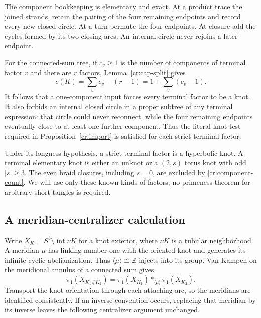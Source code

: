 The component bookkeeping is elementary and exact. At a product trace the joined strands, retain the pairing of the four remaining endpoints and record every new closed circle. At a turn permute the four endpoints. At closure add the cycles formed by its two closing arcs. An internal circle never rejoins a later endpoint.

For the connected-sum tree, if $c_v\ge1$ is the number of components of terminal factor $v$ and there are $r$ factors, Lemma~\ref{cr:cap-split} gives
\begin{equation}\label{cr:component-count}
               c(K)=\sum_v c_v-(r-1)
                    =1+\sum_v(c_v-1).
\end{equation}
It follows that a one-component input forces every terminal factor to be a knot. It also forbids an internal closed circle in a proper subtree of any terminal expression: that circle could never reconnect, while the four remaining endpoints eventually close to at least one further component. Thus the literal knot test required in Proposition~\ref{cr:import} is satisfied for each strict terminal factor.

Under its longness hypothesis, a strict terminal factor is a hyperbolic knot. A terminal elementary knot is either an unknot or a $(2,s)$ torus knot with odd $|s|\ge3$. The even braid closures, including $s=0$, are excluded by \eqref{cr:component-count}. We will use only these known kinds of factors; no primeness theorem for arbitrary short tangles is required.

\subsection{A meridian-centralizer calculation}

Write $X_K=S^3\setminus\operatorname{int}\nu K$ for a knot exterior, where $\nu K$ is a tubular neighborhood. A meridian $\mu$ has linking number one with the oriented knot and generates its infinite cyclic abelianization. Thus $\langle\mu\rangle\cong\mathbb Z$ injects into its group. Van Kampen on the meridional annulus of a connected sum gives
\begin{equation}\label{cr:amalgam}
 \pi_1(X_{K_1\#K_2})
       =\pi_1(X_{K_1})*_{\langle\mu\rangle}\pi_1(X_{K_2}).
\end{equation}
Transport the knot orientation through each attaching arc, so the meridians are identified consistently. If an inverse convention occurs, replacing that meridian by its inverse leaves the following centralizer argument unchanged.

